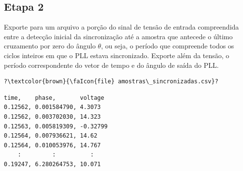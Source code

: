 \subsection*{Etapa 2}
Exporte para um arquivo  a porção do sinal de tensão de entrada compreendida entre a detecção
inicial da sincronização até a amostra que antecede o último cruzamento por zero do ângulo $\theta$, ou seja, o período
que compreende todos os ciclos inteiros em que o PLL estava sincronizado.
Exporte além da tensão, o período correspondente do vetor de tempo e do ângulo de saída do PLL.


\pagebreak

\begin{verbatim}
?\textcolor{brown}{\faIcon{file} amostras\_sincronizadas.csv}?
\end{verbatim}
\vspace{-0.8em}
\begin{verbatim}
time,    phase,       voltage
0.12562, 0.001584790, 4.3073
0.12562, 0.003702030, 14.323
0.12563, 0.005819309, -0.32799
0.12564, 0.007936621, 14.62
0.12564, 0.010053976, 14.767
    :         :          :
0.19247, 6.280264753, 10.071
\end{verbatim}


